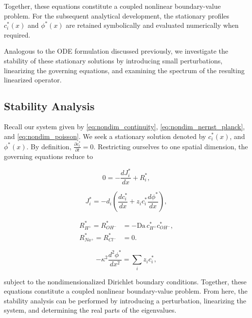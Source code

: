 \documentclass[11pt]{article}
\begin{document}
Together, these equations constitute a coupled
nonlinear boundary-value problem. For the subsequent
analytical development, the stationary profiles
$c_i^*(x)$ and $\phi^*(x)$ are retained symbolically
and evaluated numerically when required.

Analogous to the ODE formulation discussed previously,
we investigate the stability of these stationary
solutions by introducing small perturbations,
linearizing the governing equations, and examining
the spectrum of the resulting linearized operator.

\subsection{Stability Analysis}

Recall our system given by \eqref{eq:nondim_continuity}, 
\eqref{eq:nondim_nernst_planck}, and \eqref{eq:nondim_poisson}. We seek a 
stationary solution denoted by $c^*_i(x)$, and $\phi^*(x).$
By definition, $\frac{\partial c^*_i}{\partial t}=0.$ 
Restricting ourselves to one spatial dimension,
the governing equations reduce to

\begin{equation}
    0=-\frac{dJ_i^*}{dx}+R_i^*,
    \label{eq:steady_continuity}
\end{equation}

\begin{equation}
    J_i^*
    =-d_i\left(
        \frac{dc_i^*}{dx}
        +z_ic_i^*\frac{d\phi^*}{dx}
    \right),
    \label{eq:steady_nernst_planck}
\end{equation}

\begin{equation}
    \begin{aligned}
        R_{H^+}^*=R_{OH^-}^*
        &=-\mathrm{Da}\,c_{H^+}^*c_{OH^-}^*,\\
        R_{Na^+}^*=R_{Cl^-}^*&=0.
    \end{aligned}
    \label{eq:steady_reaction}
\end{equation}

\begin{equation}
    -\kappa^2\frac{d^2\phi^*}{dx^2}
    =\sum_i z_i c_i^*,
    \label{eq:steady_poisson}
\end{equation}

subject to the nondimensionalized Dirichlet
boundary conditions. Together, these equations
constitute a coupled nonlinear boundary-value
problem. From here, the stability analysis can be performed 
by introducing a perturbation, linearizing the system, and 
determining the real parts of the eigenvalues.
\end{document}
